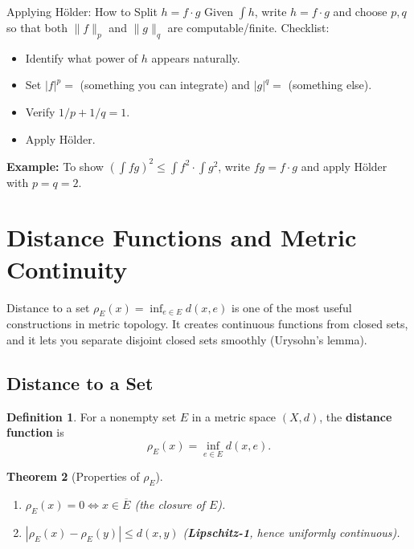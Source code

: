 \documentclass[11pt]{article}
\theoremstyle{myplain}
\newtheorem{theorem}{Theorem}[section]
\theoremstyle{definition}
\newtheorem{definition}[theorem]{Definition}
\theoremstyle{remark}
\begin{document}
\begin{technique}{Applying Hölder: How to Split $h = f \cdot g$}
Given $\int h$, write $h = f \cdot g$ and choose $p, q$ so that both $\|f\|_p$ and $\|g\|_q$ are computable/finite. Checklist:
\begin{itemize}
  \item Identify what power of $h$ appears naturally.
  \item Set $|f|^p = $ (something you can integrate) and $|g|^q = $ (something else).
  \item Verify $1/p + 1/q = 1$.
  \item Apply Hölder.
\end{itemize}
\textbf{Example:} To show $\left(\int fg\right)^2 \leq \int f^2 \cdot \int g^2$, write $fg = f \cdot g$ and apply Hölder with $p = q = 2$.
\end{technique}

\section{Distance Functions and Metric Continuity}

\begin{bigpicture}
Distance to a set $\rho_E(x) = \inf_{e \in E} d(x,e)$ is one of the most useful constructions in metric topology. It creates continuous functions from closed sets, and it lets you separate disjoint closed sets smoothly (Urysohn's lemma).
\end{bigpicture}

\subsection{Distance to a Set}

\begin{definition}
For a nonempty set $E$ in a metric space $(X,d)$, the \textbf{distance function} is
$$\rho_E(x) = \inf_{e \in E} d(x, e).$$
\end{definition}

\begin{theorem}[Properties of $\rho_E$]
\begin{enumerate}
  \item $\rho_E(x) = 0 \Longleftrightarrow x \in \overline{E}$ (the closure of $E$).
  \item $|\rho_E(x) - \rho_E(y)| \leq d(x, y)$ \quad (\textbf{Lipschitz-1}, hence uniformly continuous).
\end{enumerate}
\end{theorem}
\end{document}
